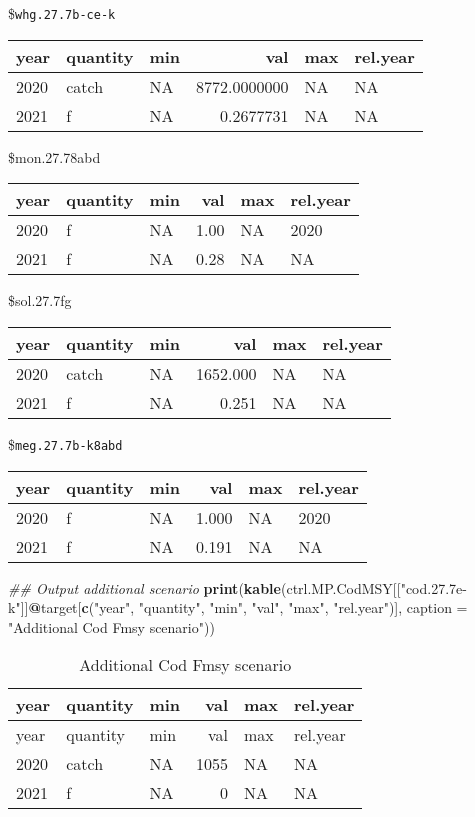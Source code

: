 \documentclass[
]{article}
\newenvironment{Shaded}{\begin{snugshade}}{\end{snugshade}}
\newcommand{\CommentTok}[1]{\textcolor[rgb]{0.56,0.35,0.01}{\textit{#1}}}
\newcommand{\DataTypeTok}[1]{\textcolor[rgb]{0.13,0.29,0.53}{#1}}
\newcommand{\KeywordTok}[1]{\textcolor[rgb]{0.13,0.29,0.53}{\textbf{#1}}}
\newcommand{\NormalTok}[1]{#1}
\newcommand{\OperatorTok}[1]{\textcolor[rgb]{0.81,0.36,0.00}{\textbf{#1}}}
\newcommand{\StringTok}[1]{\textcolor[rgb]{0.31,0.60,0.02}{#1}}
\begin{document}
\$\texttt{whg.27.7b-ce-k}

\begin{longtable}[]{@{}lllrll@{}}
\toprule
year & quantity & min & val & max & rel.year\tabularnewline
\midrule
\endhead
2020 & catch & NA & 8772.0000000 & NA & NA\tabularnewline
2021 & f & NA & 0.2677731 & NA & NA\tabularnewline
\bottomrule
\end{longtable}

\$mon.27.78abd

\begin{longtable}[]{@{}lllrll@{}}
\toprule
year & quantity & min & val & max & rel.year\tabularnewline
\midrule
\endhead
2020 & f & NA & 1.00 & NA & 2020\tabularnewline
2021 & f & NA & 0.28 & NA & NA\tabularnewline
\bottomrule
\end{longtable}

\$sol.27.7fg

\begin{longtable}[]{@{}lllrll@{}}
\toprule
year & quantity & min & val & max & rel.year\tabularnewline
\midrule
\endhead
2020 & catch & NA & 1652.000 & NA & NA\tabularnewline
2021 & f & NA & 0.251 & NA & NA\tabularnewline
\bottomrule
\end{longtable}

\$\texttt{meg.27.7b-k8abd}

\begin{longtable}[]{@{}lllrll@{}}
\toprule
year & quantity & min & val & max & rel.year\tabularnewline
\midrule
\endhead
2020 & f & NA & 1.000 & NA & 2020\tabularnewline
2021 & f & NA & 0.191 & NA & NA\tabularnewline
\bottomrule
\end{longtable}

\begin{Shaded}
\begin{Highlighting}[]
\CommentTok{## Output additional scenario}
\KeywordTok{print}\NormalTok{(}\KeywordTok{kable}\NormalTok{(ctrl.MP.CodMSY[[}\StringTok{"cod.27.7e-k"}\NormalTok{]]}\OperatorTok{@}\NormalTok{target[}\KeywordTok{c}\NormalTok{(}\StringTok{"year"}\NormalTok{, }\StringTok{"quantity"}\NormalTok{, }\StringTok{"min"}\NormalTok{, }\StringTok{"val"}\NormalTok{, }
    \StringTok{"max"}\NormalTok{, }\StringTok{"rel.year"}\NormalTok{)], }\DataTypeTok{caption =} \StringTok{"Additional Cod Fmsy scenario"}\NormalTok{))}
\end{Highlighting}
\end{Shaded}

\begin{longtable}[]{@{}lllrll@{}}
\caption{Additional Cod Fmsy scenario}\tabularnewline
\toprule
year & quantity & min & val & max & rel.year\tabularnewline
\midrule
\endfirsthead
\toprule
year & quantity & min & val & max & rel.year\tabularnewline
\midrule
\endhead
2020 & catch & NA & 1055 & NA & NA\tabularnewline
2021 & f & NA & 0 & NA & NA\tabularnewline
\bottomrule
\end{longtable}
\end{document}
